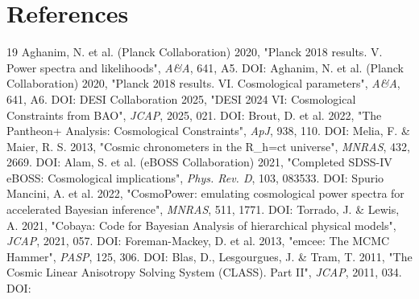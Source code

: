 \documentclass[11pt,a4paper]{article}
\begin{document}
\section{References}
{\scriptsize
\begin{thebibliography}{19}
 Aghanim, N. et al. (Planck Collaboration) 2020, "Planck 2018 results. V. Power spectra and likelihoods", \emph{A\&A}, 641, A5. DOI: \href{https://doi.org/10.1051/0004-6361/201936386}{{\small\protect{}}}
 Aghanim, N. et al. (Planck Collaboration) 2020, "Planck 2018 results. VI. Cosmological parameters", \emph{A\&A}, 641, A6. DOI: \href{https://doi.org/10.1051/0004-6361/201833910}{{\small\protect{}}}
 DESI Collaboration 2025, "DESI 2024 VI: Cosmological Constraints from BAO", \emph{JCAP}, 2025, 021. DOI: \href{https://doi.org/10.1088/1475-7516/2025/02/021}{{\small\protect{}}}
 Brout, D. et al. 2022, "The Pantheon+ Analysis: Cosmological Constraints", \emph{ApJ}, 938, 110. DOI: \href{https://doi.org/10.3847/1538-4357/ac8e04}{{\small\protect{}}}
 Melia, F. \& Maier, R. S. 2013, "Cosmic chronometers in the R\_\allowbreak{}h=ct universe", \emph{MNRAS}, 432, 2669. DOI: \href{https://doi.org/10.1093/mnras/stt1082}{{\small\protect{}}}
 Alam, S. et al. (eBOSS Collaboration) 2021, "Completed SDSS-IV eBOSS: Cosmological implications", \emph{Phys. Rev. D}, 103, 083533. DOI: \href{https://doi.org/10.1103/PhysRevD.103.083533}{{\small\protect{}}}
 Spurio Mancini, A. et al. 2022, "CosmoPower: emulating cosmological power spectra for accelerated Bayesian inference", \emph{MNRAS}, 511, 1771. DOI: \href{https://doi.org/10.1093/mnras/stac064}{{\small\protect{}}}
 Torrado, J. \& Lewis, A. 2021, "Cobaya: Code for Bayesian Analysis of hierarchical physical models", \emph{JCAP}, 2021, 057. DOI: \href{https://doi.org/10.1088/1475-7516/2021/05/057}{{\small\protect{}}}
 Foreman-Mackey, D. et al. 2013, "emcee: The MCMC Hammer", \emph{PASP}, 125, 306. DOI: \href{https://doi.org/10.1086/670067}{{\small\protect{}}}
 Blas, D., Lesgourgues, J. \& Tram, T. 2011, "The Cosmic Linear Anisotropy Solving System (CLASS). Part II", \emph{JCAP}, 2011, 034. DOI: \href{https://doi.org/10.1088/1475-7516/2011/07/034}{{\small\protect{}}}

\end{thebibliography}}
\end{document}
